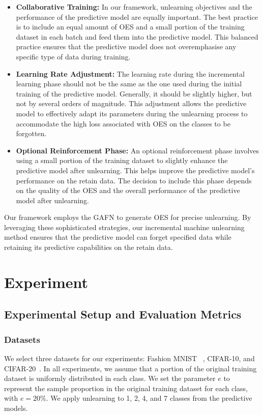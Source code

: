 \documentclass[preprint,12pt]{elsarticle}
\begin{document}
\begin{itemize}
  \item \textbf{Collaborative Training:} In our framework, unlearning objectives and the performance of the predictive model are equally important. The best practice is to include an equal amount of OES and a small portion of the training dataset in each batch and feed them into the predictive model. This balanced practice ensures that the predictive model does not overemphasise any specific type of data during training.

  \item \textbf{Learning Rate Adjustment:} The learning rate during the incremental learning phase should not be the same as the one used during the initial training of the predictive model. Generally, it should be slightly higher, but not by several orders of magnitude. This adjustment allows the predictive model to effectively adapt its parameters during the unlearning process to accommodate the high loss associated with OES on the classes to be forgotten.

  \item \textbf{Optional Reinforcement Phase:} An optional reinforcement phase involves using a small portion of the training dataset to slightly enhance the predictive model after unlearning. This helps improve the predictive model's performance on the retain data. The decision to include this phase depends on the quality of the OES and the overall performance of the predictive model after unlearning.
\end{itemize}

Our framework employs the GAFN to generate OES for precise unlearning. By leveraging these sophisticated strategies, our incremental machine unlearning method ensures that the predictive model can forget specified data while retaining its predictive capabilities on the retain data.

\section{Experiment}

\subsection{Experimental Setup and Evaluation Metrics}
\label{subsec_experiment_setup}

\subsubsection{Datasets}  
We select three datasets for our experiments: Fashion MNIST ~\cite{xiao2017fashion}, CIFAR-10, and CIFAR-20~\cite{krizhevsky2009learning}. In all experiments, we assume that a portion of the original training dataset is uniformly distributed in each class. We set the parameter $e$ to represent the sample proportion in the original training dataset for each class, with $e=20\%$. We apply unlearning to 1, 2, 4, and 7 classes from the predictive models.
\end{document}
